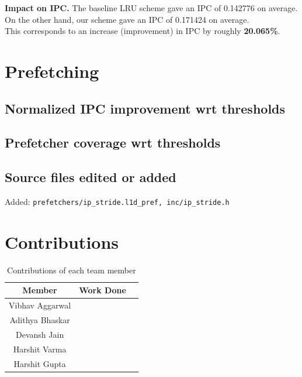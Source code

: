 \documentclass[11pt, swedish, openany]{book}
\begin{document}
\textbf{Impact on IPC.} The baseline LRU scheme gave an IPC of 0.142776 on average. On the other hand, our scheme gave an IPC of 0.171424 on average.\\
This corresponds to an increase (improvement) in IPC by roughly \textbf{20.065\%}.

\chapter{Prefetching}


\section{Normalized IPC improvement wrt thresholds}
\section{Prefetcher coverage wrt thresholds}
\section{Source files edited or added}
Added: \texttt{prefetchers/ip\_stride.l1d\_pref, inc/ip\_stride.h}

\chapter{Contributions}
 {\renewcommand{\arraystretch}{1.2}  %
  \begin{table}[h]
    \centering
    \begin{tabular}{|c|c|p{6cm}|}
      \hline
      \textbf{Member} & \textbf{Work Done} \\
      \hline
      \hline
      Vibhav Aggarwal &                    \\
      Adithya Bhaskar &                    \\
      Devansh Jain    &                    \\
      Harshit Varma   &                    \\
      Harshit Gupta   &                    \\
      \hline
    \end{tabular}
    \caption{Contributions of each team member}
  \end{table}}
\end{document}
